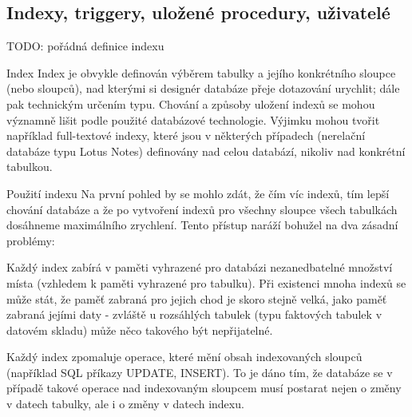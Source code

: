 \subsection{Indexy, triggery, uložené procedury, uživatelé}

TODO: pořádná definice indexu

\begin{obecne}{Index}
Index je obvykle definován výběrem tabulky a jejího konkrétního sloupce (nebo sloupců), nad kterými si designér databáze přeje dotazování urychlit; dále pak technickým určením typu. Chování a způsoby uložení indexů se mohou významně lišit podle použité databázové technologie.
Výjimku mohou tvořit například full-textové indexy, které jsou v některých případech (nerelační databáze typu Lotus Notes) definovány nad celou databází, nikoliv nad konkrétní tabulkou. 
\end{obecne}

\begin{obecne}{Použití indexu}
Na první pohled by se mohlo zdát, že čím víc indexů, tím lepší chování databáze a že po vytvoření indexů pro všechny sloupce všech tabulkách dosáhneme maximálního zrychlení. Tento přístup naráží bohužel na dva zásadní problémy: 
\begin{penumerate}
    \item Každý index zabírá v paměti vyhrazené pro databázi nezanedbatelné množství místa (vzhledem k paměti vyhrazené pro tabulku). Při existenci mnoha indexů se může stát, že paměť zabraná pro jejich chod je skoro stejně velká, jako paměť zabraná jejími daty - zvláště u rozsáhlých tabulek (typu faktových tabulek v datovém skladu) může něco takového být nepřijatelné. 
    \item Každý index zpomaluje operace, které mění obsah indexovaných sloupců (například SQL příkazy UPDATE, INSERT). To je dáno tím, že databáze se v případě takové operace nad indexovaným sloupcem musí postarat nejen o změny v datech tabulky, ale i o změny v datech indexu. 
\end{penumerate}
\end{obecne}

